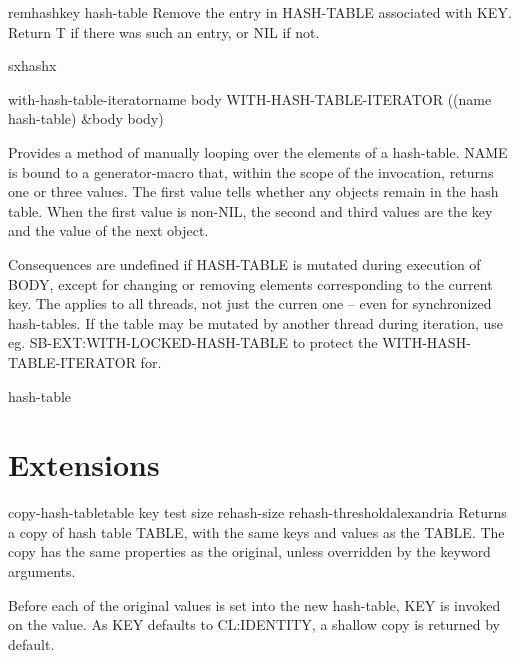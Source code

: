 \begin{function}{remhash}{key hash-table}{}{}
  Remove the entry in HASH-TABLE associated with KEY. Return T if
there was such an entry, or NIL if not.
\end{function}

\begin{function}{sxhash}{x}{}{}
  
\end{function}

\begin{macro}{with-hash-table-iterator}{name \body body}{}{}
  WITH-HASH-TABLE-ITERATOR ((name hash-table) \&body body)

Provides a method of manually looping over the elements of a hash-table. NAME
is bound to a generator-macro that, within the scope of the invocation,
returns one or three values. The first value tells whether any objects remain
in the hash table. When the first value is non-NIL, the second and third
values are the key and the value of the next object.

Consequences are undefined if HASH-TABLE is mutated during execution of BODY,
except for changing or removing elements corresponding to the current key. The
applies to all threads, not just the curren one -- even for synchronized
hash-tables. If the table may be mutated by another thread during iteration,
use eg. SB-EXT:WITH-LOCKED-HASH-TABLE to protect the WITH-HASH-TABLE-ITERATOR
for.
\end{macro}

\begin{class}{hash-table}{}{}{}
  
\end{class}

\section{Extensions}
\label{sec:extensions}

\begin{function}{copy-hash-table}{table \key key test size rehash-size rehash-threshold}{alexandria}{}
  Returns a copy of hash table TABLE, with the same keys and values
as the TABLE. The copy has the same properties as the original, unless
overridden by the keyword arguments.

Before each of the original values is set into the new hash-table, KEY
is invoked on the value. As KEY defaults to CL:IDENTITY, a shallow
copy is returned by default.
\end{function}

